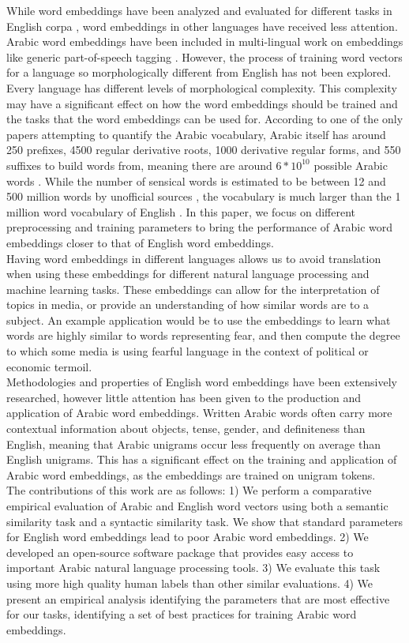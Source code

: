 While word embeddings have been analyzed and evaluated for different tasks in English corpa \cite{mikoloveffic:2013,dos2014deep}, word embeddings in other languages have received less attention. Arabic word embeddings have been included in multi-lingual work on embeddings like generic part-of-speech tagging \cite{al:2013}. However, the process of training word vectors for a language so morphologically different from English has not been explored. Every language has different levels of morphological complexity. This complexity may have a significant effect on how the word embeddings should be trained and the tasks that the word embeddings can be used for. According to one of the only papers attempting to quantify the Arabic vocabulary, Arabic itself has around 250 prefixes, 4500 regular derivative roots, 1000 derivative regular forms, and 550 suffixes to build words from, meaning there are around $6*10^{10}$ possible Arabic words \cite{ahmed2000alarge}. While the number of sensical words is estimated to be between 12 and 500 million words by unofficial sources \cite{Lameen:2013,Muhammad:2015}, the vocabulary is much larger than the 1 million word vocabulary of English \cite{Googl96:online}. In this paper, we focus on different preprocessing and training parameters to bring the performance of Arabic word embeddings closer to that of English word embeddings.
\\
Having word embeddings in different languages allows us to avoid translation when using these embeddings for different natural language processing and machine learning tasks. These embeddings can allow for the interpretation of topics in media, or provide an understanding of how similar words are to a subject. An example application would be to use the embeddings to learn what words are highly similar to words representing fear, and then compute the degree to which some media is using fearful language in the context of political or economic termoil.
\\
Methodologies and properties of English word embeddings have been extensively researched, however little attention has been given to the production and application of Arabic word embeddings. Written Arabic words often carry more contextual information about objects, tense, gender, and definiteness than English, meaning that Arabic unigrams occur less frequently on average than English unigrams. This has a significant effect on the training and application of Arabic word embeddings, as the embeddings are trained on unigram tokens.
\\
The contributions of this work are as follows: 1) We perform a comparative empirical evaluation of Arabic and English word vectors using both a semantic similarity task and a syntactic similarity task. We show that standard parameters for English word embeddings lead to poor Arabic word embeddings. 2) We developed an open-source software package that provides easy access to important Arabic natural language processing tools. 3) We evaluate this task using more high quality human labels than other similar evaluations. 4) We present an empirical analysis identifying the parameters that are most effective for our tasks, identifying a set of best practices for training Arabic word embeddings.
